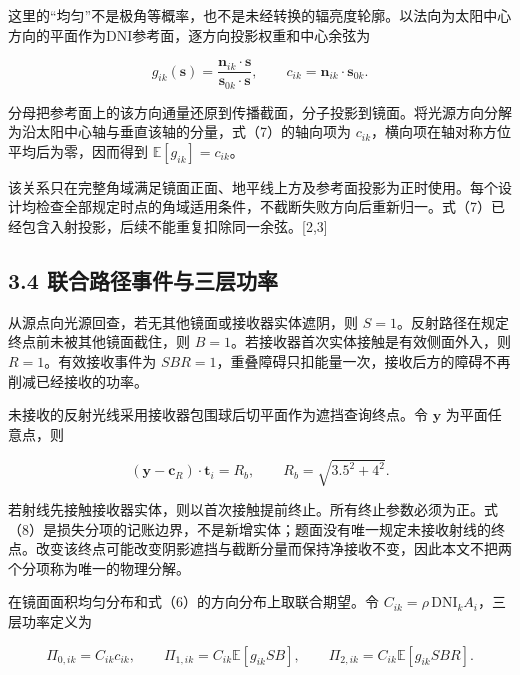 \documentclass[UTF8,fontset=windows,zihao=-4]{ctexart}
\begin{document}
\par\noindent\begin{minipage}{\linewidth}
这里的“均匀”不是极角等概率，也不是未经转换的辐亮度轮廓。以法向为太阳中心方向的平面作为DNI参考面，逐方向投影权重和中心余弦为

\[
g_{ik}(\boldsymbol s)=\frac{\boldsymbol n_{ik}\cdot\boldsymbol s}{\boldsymbol s_{0k}\cdot\boldsymbol s},
\qquad c_{ik}=\boldsymbol n_{ik}\cdot\boldsymbol s_{0k}.
\tag{7}
\]
\end{minipage}\par

分母把参考面上的该方向通量还原到传播截面，分子投影到镜面。将光源方向分解为沿太阳中心轴与垂直该轴的分量，式（7）的轴向项为 \(c_{ik}\)，横向项在轴对称方位平均后为零，因而得到 \(\mathbb E[g_{ik}]=c_{ik}\)。

该关系只在完整角域满足镜面正面、地平线上方及参考面投影为正时使用。每个设计均检查全部规定时点的角域适用条件，不截断失败方向后重新归一。式（7）已经包含入射投影，后续不能重复扣除同一余弦。[2,3]

\subsection*{3.4 联合路径事件与三层功率}

从源点向光源回查，若无其他镜面或接收器实体遮阴，则 \(S=1\)。反射路径在规定终点前未被其他镜面截住，则 \(B=1\)。若接收器首次实体接触是有效侧面外入，则 \(R=1\)。有效接收事件为 \(SBR=1\)，重叠障碍只扣能量一次，接收后方的障碍不再削减已经接收的功率。

\par\noindent\begin{minipage}{\linewidth}
未接收的反射光线采用接收器包围球后切平面作为遮挡查询终点。令 \(\boldsymbol y\) 为平面任意点，则

\[
(\boldsymbol y-\boldsymbol c_R)\cdot\boldsymbol t_i=R_b,
\qquad R_b=\sqrt{3.5^2+4^2}.
\tag{8}
\]
\end{minipage}\par

若射线先接触接收器实体，则以首次接触提前终止。所有终止参数必须为正。式（8）是损失分项的记账边界，不是新增实体；题面没有唯一规定未接收射线的终点。改变该终点可能改变阴影遮挡与截断分量而保持净接收不变，因此本文不把两个分项称为唯一的物理分解。

\par\noindent\begin{minipage}{\linewidth}
在镜面面积均匀分布和式（6）的方向分布上取联合期望。令 \(C_{ik}=\rho\,\mathrm{DNI}_kA_i\)，三层功率定义为

\[
\Pi_{0,ik}=C_{ik}c_{ik},\qquad
\Pi_{1,ik}=C_{ik}\mathbb E[g_{ik}SB],\qquad
\Pi_{2,ik}=C_{ik}\mathbb E[g_{ik}SBR].
\tag{9}
\]
\end{minipage}\par
\end{document}
